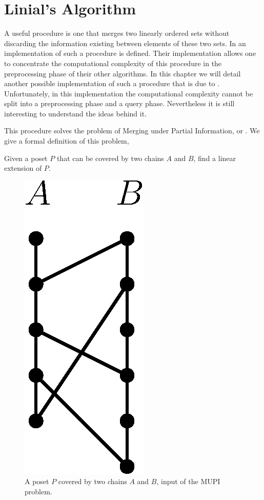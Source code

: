 \section{Linial's Algorithm}

A useful procedure is one that merges two linearly ordered sets without
discarding the information existing between elements of these two sets. In
\citet*{cardinal:2013} an implementation of such a procedure is defined. Their
implementation allows one to concentrate the computational complexity of this
procedure in the preprocessing phase of their other algorithms. In this chapter
we will detail another possible implementation of such a procedure that is due
to \citet*{linial:1984}. Unfortunately, in this implementation the
computational complexity cannot be split into a preprocessing phase and a query
phase. Nevertheless it is still interesting to understand the ideas behind it.

This procedure solves the problem of Merging under Partial Information, or
. We give a formal definition of this problem,

\begin{problem}
Given a poset \(P\) that can be covered by two chains \(A\) and \(B\), find a
linear extension of \(P\).
\end{problem}

\begin{figure}
\centering
\includegraphics[height=0.2\textheight]{fig/supi/mupi}
\caption{A poset \(P\) covered by two chains \(A\) and \(B\),
input of the MUPI problem.}
\label{fig:supi:mupi}
\end{figure}

